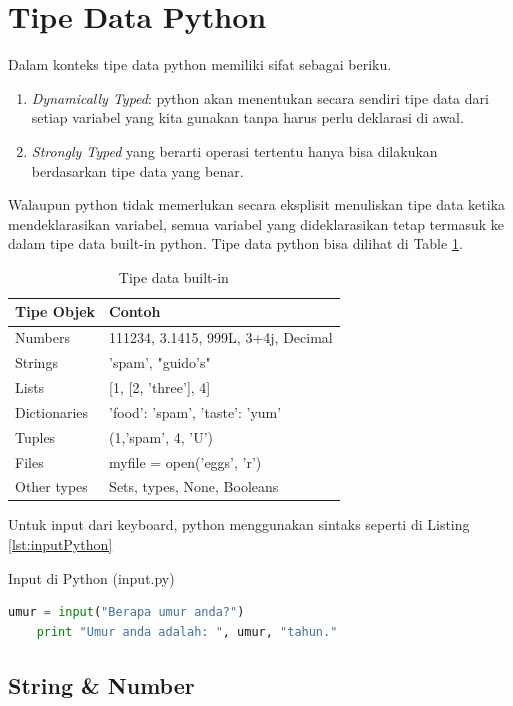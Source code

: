 \section{Tipe Data Python}

Dalam konteks tipe data python memiliki sifat sebagai beriku.
\begin{enumerate}
	\item \textit{Dynamically Typed}: python akan menentukan secara sendiri tipe data dari setiap variabel yang kita gunakan tanpa harus perlu deklarasi di awal.
	\item \textit{Strongly Typed} yang berarti operasi tertentu hanya bisa dilakukan berdasarkan tipe data yang benar. 
\end{enumerate}

Walaupun python tidak memerlukan secara eksplisit menuliskan tipe data ketika mendeklarasikan variabel, semua variabel yang dideklarasikan tetap termasuk ke dalam tipe data built-in python. Tipe data python bisa dilihat di Table \ref{tbl:tipeDataPython}.

\begin{table}[H]%
\caption{Tipe data built-in}
\centering
\begin{tabular}{|l|l|}
\hline
Tipe Objek & Contoh \\
\hline
Numbers & 111234, 3.1415, 999L, 3+4j, Decimal\\
Strings & 'spam', "guido's"\\
Lists & [1, [2, 'three'], 4]\\
Dictionaries & {'food': 'spam', 'taste': 'yum'}\\
Tuples & (1,'spam', 4, 'U')\\
Files & myfile = open('eggs', 'r')\\
Other types & Sets, types, None, Booleans\\
\hline
\end{tabular}
\label{tbl:tipeDataPython}
\end{table} 

Untuk input dari keyboard, python menggunakan sintaks seperti di Listing \ref{lst:inputPython}
\begin{listprog}{Input di Python (input.py)}
	\label{lst:inputPython}
	\begin{lstlisting}[language=Python]
	umur = input("Berapa umur anda?")
	print "Umur anda adalah: ", umur, "tahun."
	\end{lstlisting}
\end{listprog}

\subsection{String \& Number}

